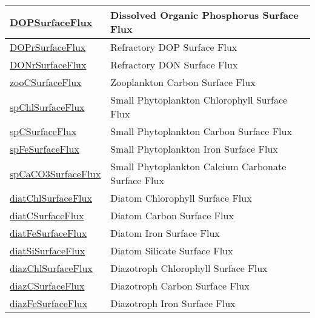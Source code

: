 {\begin{center}
\begin{longtable}{| p{2.0in} | p{4.0in} |}
    \hline
    \hyperref[subsec:var_sec_tracersSurfaceFlux_DOPSurfaceFlux]{DOPSurfaceFlux} & Dissolved Organic Phosphorus Surface Flux \\
    \hline
    \hyperref[subsec:var_sec_tracersSurfaceFlux_DOPrSurfaceFlux]{DOPrSurfaceFlux} & Refractory DOP Surface Flux \\
    \hline
    \hyperref[subsec:var_sec_tracersSurfaceFlux_DONrSurfaceFlux]{DONrSurfaceFlux} & Refractory DON Surface Flux \\
    \hline
    \hyperref[subsec:var_sec_tracersSurfaceFlux_zooCSurfaceFlux]{zooCSurfaceFlux} & Zooplankton Carbon Surface Flux \\
    \hline
    \hyperref[subsec:var_sec_tracersSurfaceFlux_spChlSurfaceFlux]{spChlSurfaceFlux} & Small Phytoplankton Chlorophyll Surface Flux \\
    \hline
    \hyperref[subsec:var_sec_tracersSurfaceFlux_spCSurfaceFlux]{spCSurfaceFlux} & Small Phytoplankton Carbon Surface Flux \\
    \hline
    \hyperref[subsec:var_sec_tracersSurfaceFlux_spFeSurfaceFlux]{spFeSurfaceFlux} & Small Phytoplankton Iron Surface Flux \\
    \hline
    \hyperref[subsec:var_sec_tracersSurfaceFlux_spCaCO3SurfaceFlux]{spCaCO3SurfaceFlux} & Small Phytoplankton Calcium Carbonate Surface Flux \\
    \hline
    \hyperref[subsec:var_sec_tracersSurfaceFlux_diatChlSurfaceFlux]{diatChlSurfaceFlux} & Diatom Chlorophyll Surface Flux \\
    \hline
    \hyperref[subsec:var_sec_tracersSurfaceFlux_diatCSurfaceFlux]{diatCSurfaceFlux} & Diatom Carbon Surface Flux \\
    \hline
    \hyperref[subsec:var_sec_tracersSurfaceFlux_diatFeSurfaceFlux]{diatFeSurfaceFlux} & Diatom Iron Surface Flux \\
    \hline
    \hyperref[subsec:var_sec_tracersSurfaceFlux_diatSiSurfaceFlux]{diatSiSurfaceFlux} & Diatom Silicate Surface Flux \\
    \hline
    \hyperref[subsec:var_sec_tracersSurfaceFlux_diazChlSurfaceFlux]{diazChlSurfaceFlux} & Diazotroph Chlorophyll Surface Flux \\
    \hline
    \hyperref[subsec:var_sec_tracersSurfaceFlux_diazCSurfaceFlux]{diazCSurfaceFlux} & Diazotroph Carbon Surface Flux \\
    \hline
    \hyperref[subsec:var_sec_tracersSurfaceFlux_diazFeSurfaceFlux]{diazFeSurfaceFlux} & Diazotroph Iron Surface Flux \\

\end{longtable}
\end{center}}
